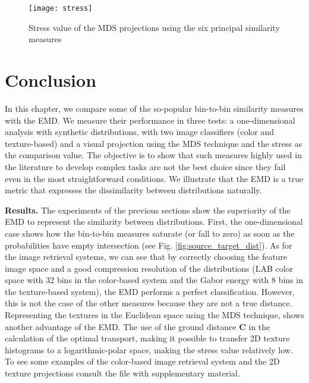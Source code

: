 \begin{figure}[!ht]
    \centering
    \texttt{[image: stress]}
 \caption{Stress value of the MDS projections using the six principal similarity measures}
 \label{fig:stress}
\end{figure}
 
\section{Conclusion}\label{sec:conclusions}

In this chapter, we compare some of the so-popular bin-to-bin similarity measures with the EMD. We measure their performance in three tests: a one-dimensional analysis with synthetic distributions, with two image classifiers (color and texture-based) and a visual projection using the MDS technique and the stress as the comparison value. The objective is to show that such measures highly used in the literature to develop complex tasks are not the best choice since they fail even in the most straightforward conditions. We illustrate that the EMD is a true metric \citep{Peyre.Cuturi:arXiv:2018} that expresses the dissimilarity between distributions naturally.

\textbf{Results.}
The experiments of the previous sections show the superiority of the EMD to represent the similarity between distributions. First, the one-dimensional case shows how the bin-to-bin measures saturate (or fall to zero) as soon as the probabilities have empty intersection (see Fig. \ref{fig:source_target_dist}). As for the image retrieval systems, we can see that by correctly choosing the feature image space and a good compression resolution of the distributions (LAB color space with 32 bins in the color-based system and the Gabor energy with 8 bins in the texture-based system), the EMD performs a perfect classification. However, this is not the case of the other measures because they are not a true distance. Representing the textures in the Euclidean space using the MDS technique, shows another advantage of the EMD. The use of the ground distance $\textbf{C}$ in the calculation of the optimal transport, making it possible to transfer 2D texture histograms to a logarithmic-polar space, making the stress value relatively low. To see some examples of the color-based image retrieval system and the 2D texture projections consult the file with supplementary material.



